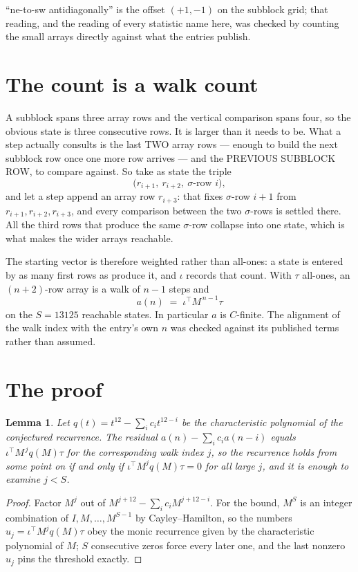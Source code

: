 \documentclass[11pt,a4paper]{article}
\theoremstyle{plain}
\newtheorem{lemma}[theorem]{Lemma}
\theoremstyle{definition}
\begin{document}
``ne-to-sw antidiagonally'' is the offset $(+1,-1)$ on the subblock grid; that reading, and
the reading of every statistic name here, was checked by counting the small arrays directly
against what the entries publish.

\section{The count is a walk count}

A subblock spans three array rows and the vertical comparison spans four, so the obvious state
is three consecutive rows. It is larger than it needs to be. What a step actually consults is
the last TWO array rows --- enough to build the next subblock row once one more row arrives ---
and the PREVIOUS SUBBLOCK ROW, to compare against. So take as state the triple
\[
\bigl(r_{i+1},\ r_{i+2},\ \sigma\text{-row }i\bigr),
\]
and let a step append an array row $r_{i+3}$: that fixes $\sigma$-row $i+1$ from
$r_{i+1},r_{i+2},r_{i+3}$, and every comparison between the two $\sigma$-rows is settled
there. All the third rows that produce the same $\sigma$-row collapse into one state, which is
what makes the wider arrays reachable.

The starting vector is therefore weighted rather than all-ones: a state is entered by as many
first rows as produce it, and $\iota$ records that count. With $\tau$ all-ones, an
$(n+2)$-row array is a walk of $n-1$ steps and
\[
a(n)\;=\;\iota^{\!\top}M^{\,n-1}\tau
\]
on the $S=13125$ reachable states. In particular $a$ is $C$-finite. The alignment of the walk
index with the entry's own $n$ was checked against its published terms rather than assumed.

\section{The proof}

\begin{lemma}\label{lem:crit}
Let $q(t)=t^{12}-\sum_i c_it^{12-i}$ be the characteristic polynomial of the
conjectured recurrence. The residual $a(n)-\sum_ic_ia(n-i)$ equals
$\iota^{\!\top}M^{\,j}q(M)\tau$ for the corresponding walk index $j$, so the recurrence
holds from some point on if and only if $\iota^{\!\top}M^{j}q(M)\tau=0$ for all large $j$,
and it is enough to examine $j<S$.
\end{lemma}

\begin{proof}
Factor $M^{j}$ out of $M^{j+12}-\sum_ic_iM^{j+12-i}$. For the bound, $M^{S}$
is an integer combination of $I,M,\dots,M^{S-1}$ by Cayley--Hamilton, so the numbers
$u_j=\iota^{\!\top}M^{j}q(M)\tau$ obey the monic recurrence given by the characteristic
polynomial of $M$; $S$ consecutive zeros force every later one, and the last nonzero $u_j$
pins the threshold exactly.
\end{proof}
\end{document}
